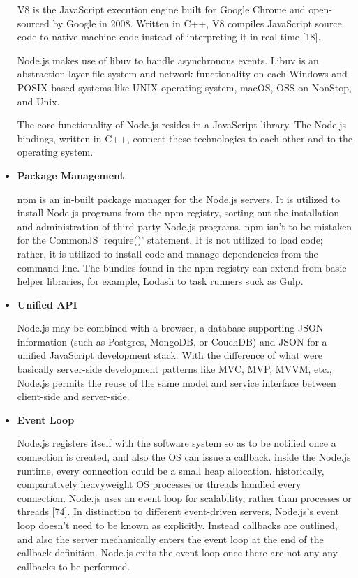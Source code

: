 \documentclass[../thesis.tex]{subfiles}
\begin{document}
\begin{itemize}
    V8 is the JavaScript execution engine built for Google Chrome and open-sourced by Google in 2008. Written in C++, V8 compiles JavaScript source code to native machine code instead of interpreting it in real time [18].
    \newline
    
    Node.js makes use of libuv to handle asynchronous events. Libuv is an abstraction layer file system and network functionality on each Windows and POSIX-based systems like UNIX operating system, macOS, OSS on NonStop, and Unix.
    \newline
    
    The core functionality of Node.js resides in a JavaScript library. The Node.js bindings, written in C++, connect these technologies to each other and to the operating system.
    \newline
    
    \item \textbf{Package Management}
    \newline
    
    npm is an in-built package manager for the Node.js servers. It is utilized to install Node.js programs from the npm registry, sorting out the installation and administration of third-party Node.js programs. npm isn't to be mistaken for the CommonJS 'require()' statement. It is not utilized to load code; rather, it is utilized to install code and manage dependencies from the command line. The bundles found in the npm registry can extend from basic helper libraries, for example, Lodash to task runners suck as Gulp.
    \newline
    
    \item \textbf{Unified API}
    \newline
    
    Node.js may be combined with a browser, a database supporting JSON information (such as Postgres, MongoDB, or CouchDB) and JSON for a unified JavaScript development stack. With the difference of what were basically server-side development patterns like MVC, MVP, MVVM, etc., Node.js permits the reuse of the same model and service interface between client-side and server-side.
    \newline
    
    \item \textbf{Event Loop}
    \newline
    
    Node.js registers itself with the software system so as to be notified once a connection is created, and also the OS can issue a callback. inside the Node.js runtime, every connection could be a small heap allocation. historically, comparatively heavyweight OS processes or threads handled every connection. Node.js uses an event loop for scalability, rather than processes or threads [74]. In distinction to different event-driven servers, Node.js's event loop doesn't need to be known as explicitly. Instead callbacks are outlined, and also the server mechanically enters the event loop at the end of the callback definition. Node.js exits the event loop once there are not any any callbacks to be performed.
    \newline
    

\end{itemize}
\end{document}
